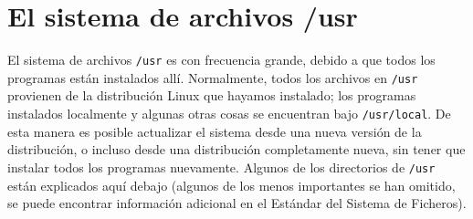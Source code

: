 \documentclass[12pt]{article}
\begin{document}
\section{ El sistema de archivos /usr}
El sistema de archivos \texttt{/usr} es con frecuencia grande,
debido a que todos los programas están instalados allí. Normalmente, todos los
archivos en \texttt{/usr} provienen de la distribución Linux que
hayamos instalado; los programas instalados localmente y algunas otras cosas
se encuentran bajo \texttt{/usr/local}. De esta manera es posible
actualizar el sistema desde una nueva versión de la distribución, o incluso
desde una distribución completamente nueva, sin tener que instalar todos los
programas nuevamente. Algunos de los directorios de \texttt{/usr}
están explicados aquí debajo (algunos de los menos importantes se han omitido,
se puede encontrar información adicional en el Estándar del Sistema de
Ficheros).  
\end{document}
